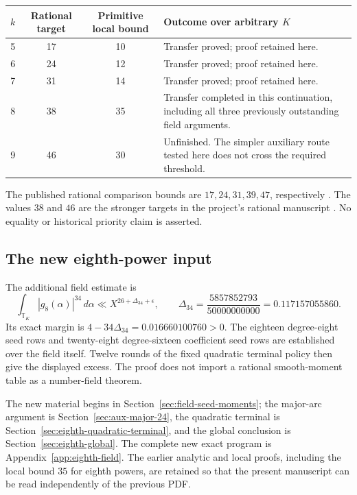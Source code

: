 \documentclass[11pt,reqno]{amsart}
\numberwithin{equation}{section}
\theoremstyle{definition}
\begin{document}
\begin{center}
\begin{tabular}{@{}c c c p{6.5cm}@{}}
\toprule
$k$&Rational target&Primitive local bound&Outcome over arbitrary $K$\\
\midrule
5&17&10&Transfer proved; proof retained here.\\
6&24&12&Transfer proved; proof retained here.\\
7&31&14&Transfer proved; proof retained here.\\
8&38&35&Transfer completed in this continuation, including all three previously outstanding field arguments.\\
9&46&30&Unfinished. The simpler auxiliary route tested here does not cross the required threshold.\\
\bottomrule
\end{tabular}
\end{center}

The published rational comparison bounds are $17,24,31,39,47$, respectively
\cite{VW1995,VW1994,Wooley2016}.  The values $38$ and $46$ are the stronger
targets in the project's rational manuscript \cite{ProjectG89}.
No equality or historical priority claim is asserted.

\subsection{The new eighth-power input}

The additional field estimate is
\[
 \int_{\mathbb T_K}|g_8(\alpha)|^{34}\,d\alpha
       \ll X^{26+\Delta_{34}+\epsilon},\qquad
 \Delta_{34}=\frac{5857852793}{50000000000}=0.117157055860.
\]
Its exact margin is $4-34\Delta_{34}=0.016660100760>0$.
The eighteen degree-eight seed rows and twenty-eight degree-sixteen
coefficient seed rows are established over the field itself. Twelve
rounds of the fixed quadratic terminal policy then give the displayed
excess. The proof does not import a rational smooth-moment table as a
number-field theorem.

The new material begins in Section~\ref{sec:field-seed-moments};
the major-arc argument is Section~\ref{sec:aux-major-24}, the quadratic
terminal is Section~\ref{sec:eighth-quadratic-terminal}, and the global
conclusion is Section~\ref{sec:eighth-global}. The complete new exact
program is Appendix~\ref{app:eighth-field}. The earlier analytic and
local proofs, including the local bound $35$ for eighth powers, are
retained so that the present manuscript can be read independently of
the previous PDF.
\end{document}
